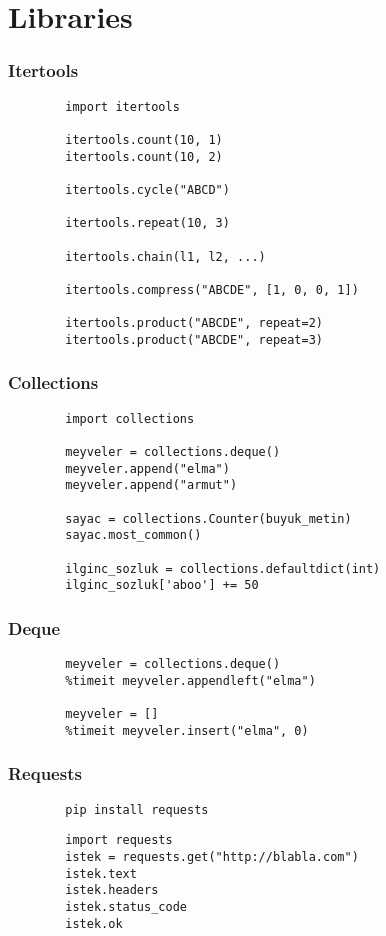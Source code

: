 \documentclass[10pt, compress]{beamer}
\begin{document}
\section{Libraries}

\begin{frame}[fragile]
\frametitle{Itertools}    
    \begin{verbatim}
        import itertools
        
        itertools.count(10, 1)
        itertools.count(10, 2)
        
        itertools.cycle("ABCD")
        
        itertools.repeat(10, 3)
        
        itertools.chain(l1, l2, ...)
        
        itertools.compress("ABCDE", [1, 0, 0, 1])
        
        itertools.product("ABCDE", repeat=2)
        itertools.product("ABCDE", repeat=3)
    \end{verbatim}
\end{frame}

\begin{frame}[fragile]
\frametitle{Collections}    
    \begin{verbatim}
        import collections
        
        meyveler = collections.deque()
        meyveler.append("elma")
        meyveler.append("armut")
        
        sayac = collections.Counter(buyuk_metin)
        sayac.most_common()
        
        ilginc_sozluk = collections.defaultdict(int)
        ilginc_sozluk['aboo'] += 50
    \end{verbatim}
\end{frame}

\begin{frame}[fragile]
\frametitle{Deque}    
    \begin{verbatim}
        meyveler = collections.deque()
        %timeit meyveler.appendleft("elma")
        
        meyveler = []
        %timeit meyveler.insert("elma", 0)
    \end{verbatim}
\end{frame}

\begin{frame}[fragile]
\frametitle{Requests}    
    \begin{verbatim}
        pip install requests
    \end{verbatim}
    
    \begin{verbatim}
        import requests
        istek = requests.get("http://blabla.com")
        istek.text
        istek.headers
        istek.status_code
        istek.ok
    \end{verbatim}
\end{frame}
\end{document}
